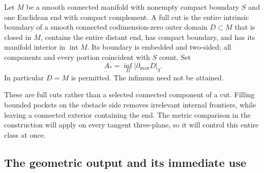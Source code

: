 \begin{definition}\label{four:def:cuts}
Let $M$ be a smooth connected manifold with nonempty compact boundary $S$
and one Euclidean end with compact complement. A full cut is the entire
intrinsic boundary of a smooth connected codimension-zero outer domain
$D\subset M$ that is closed in $M$, contains the entire distant end,
has compact boundary, and has its manifold interior in $\operatorname{int}M$.
Its boundary is embedded and two-sided; all components and every portion
coincident with $S$ count. Set
\[
 A_* = \inf_D |\partial_{\mathrm{man}}D|_g.
\]
In particular $D=M$ is permitted. The infimum need not be attained.
\end{definition}

These are full cuts rather than a selected connected component of a cut.
Filling bounded pockets on the obstacle side removes irrelevant internal
frontiers, while leaving a connected exterior containing the end. The
metric comparison in the construction will apply on every tangent
three-plane, so it will control this entire class at once.

\subsection{The geometric output and its immediate use}

